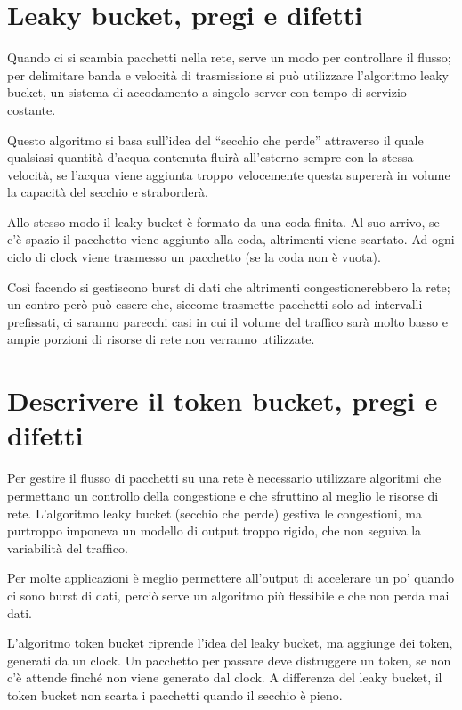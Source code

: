 \section{Leaky bucket, pregi e difetti}

Quando ci si scambia pacchetti nella rete, serve un modo per controllare il flusso; per delimitare banda e velocità di trasmissione si può utilizzare l’algoritmo leaky bucket, un sistema di accodamento a singolo server con tempo di servizio costante.

Questo algoritmo si basa sull’idea del “secchio che perde” attraverso il quale qualsiasi quantità d’acqua contenuta fluirà all’esterno sempre con la stessa velocità, se l’acqua viene aggiunta troppo velocemente questa supererà in volume la capacità del secchio e straborderà.

Allo stesso modo il leaky bucket è formato da una coda finita. Al suo arrivo, se c’è spazio il pacchetto viene aggiunto alla coda, altrimenti viene scartato. Ad ogni ciclo di clock viene trasmesso un pacchetto (se la coda non è vuota).

Così facendo si gestiscono burst di dati che altrimenti congestionerebbero la rete; un contro però può essere che, siccome trasmette pacchetti solo ad intervalli prefissati, ci saranno parecchi casi in cui il volume del traffico sarà molto basso e ampie porzioni di risorse di rete non verranno utilizzate.

\section{Descrivere il token bucket, pregi e difetti}

Per gestire il flusso di pacchetti su una rete è necessario utilizzare algoritmi che permettano un controllo della congestione e che sfruttino al meglio le risorse di rete. L’algoritmo leaky bucket (secchio che perde) gestiva le congestioni, ma purtroppo imponeva un modello di output troppo rigido, che non seguiva la variabilità del traffico.

Per molte applicazioni è meglio permettere all’output di accelerare un po’ quando ci sono burst di dati, perciò serve un algoritmo più flessibile e che non perda mai dati.

L’algoritmo token bucket riprende l’idea del leaky bucket, ma aggiunge dei token, generati da un clock.
Un pacchetto per passare deve distruggere un token, se non c’è attende finché non viene generato dal clock. A differenza del leaky bucket, il token bucket non scarta i pacchetti quando il secchio è pieno.

